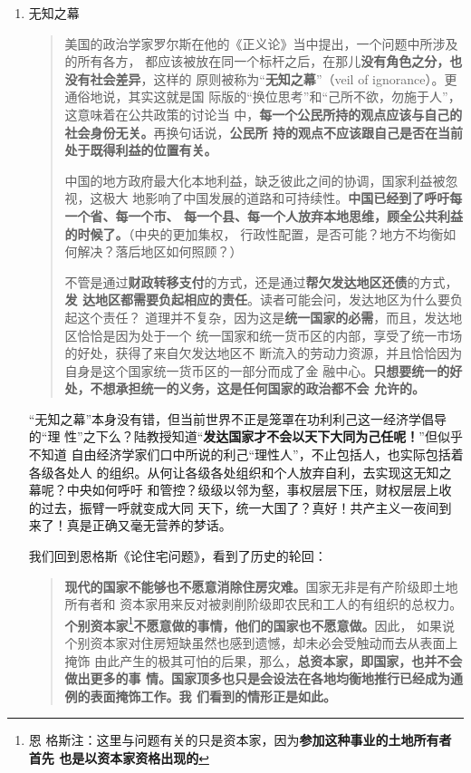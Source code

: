 \begin{enumerate}

\item 无知之幕

  \begin{quotation}
    美国的政治学家罗尔斯在他的《正义论》当中提出，一个问题中所涉及的所有各方，
    都应该被放在同一个标杆之后，在那儿\textbf{没有角色之分，也没有社会差异}，这样的
    原则被称为“\textbf{无知之幕}”（veil of ignorance）。更通俗地说，其实这就是国
    际版的“换位思考”和“己所不欲，勿施于人”，这意味着在公共政策的讨论当
    中，\textbf{每一个公民所持的观点应该与自己的社会身份无关。}再换句话说，\textbf{公民所
      持的观点不应该跟自己是否在当前处于既得利益的位置有关。}


    中国的地方政府最大化本地利益，缺乏彼此之间的协调，国家利益被忽视，这极大
    地影响了中国发展的道路和可持续性。\textbf{中国已经到了呼吁每一个省、每一个市、
      每一个县、每一个人放弃本地思维，顾全公共利益的时候了。}（中央的更加集权，
    行政性配置，是否可能？地方不均衡如何解决？落后地区如何照顾？）


    不管是通过\textbf{财政转移支付}的方式，还是通过\textbf{帮欠发达地区还债}的方式，\textbf{发
      达地区都需要负起相应的责任}。读者可能会问，发达地区为什么要负起这个责任？
    道理并不复杂，因为这是\textbf{统一国家的必需}，而且，发达地区恰恰是因为处于一个
    统一国家和统一货币区的内部，享受了统一市场的好处，获得了来自欠发达地区不
    断流入的劳动力资源，并且恰恰因为自身是这个国家统一货币区的一部分而成了金
    融中心。\textbf{只想要统一的好处，不想承担统一的义务，这是任何国家的政治都不会
      允许的。}
  \end{quotation}

  “无知之幕”本身没有错，但当前世界不正是笼罩在功利利己这一经济学倡导的“理
  性”之下么？陆教授知道“\textbf{发达国家才不会以天下大同为己任呢！}”但似乎不知道
  自由经济学家们口中所说的利己“理性人”，不止包括人，也实际包括着各级各处人
  的组织。从何让各级各处组织和个人放弃自利，去实现这无知之幕呢？中央如何呼吁
  和管控？级级以邻为壑，事权层层下压，财权层层上收的过去，振臂一呼就变成大同
  天下，统一大国了？真好！共产主义一夜间到来了！真是正确又毫无营养的梦话。


  我们回到恩格斯《论住宅问题》，看到了历史的轮回：

  \begin{quotation}
    \textbf{现代的国家不能够也不愿意消除住房灾难。}国家无非是有产阶级即土地所有者和
    资本家用来反对被剥削阶级即农民和工人的有组织的总权力。\textbf{个别资本家}\footnote{恩
      格斯注：这里与问题有关的只是资本家，因为\textbf{参加这种事业的土地所有者首先
        也是以资本家资格出现的}}\textbf{不愿意做的事情，他们的国家也不愿意做。}因此，
    如果说个别资本家对住房短缺虽然也感到遗憾，却未必会受触动而去从表面上掩饰
    由此产生的极其可怕的后果，那么，\textbf{总资本家，即国家，也并不会做出更多的事
      情。国家顶多也只是会设法在各地均衡地推行已经成为通例的表面掩饰工作。我
      们看到的情形正是如此。}
  \end{quotation}



\end{enumerate}
